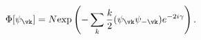 \begin{equation}
\Phi [ \psi_{\vk}] = N {\rm exp}
 \left( - \sum_k \frac{k}{2} (\psi_{\vk} \psi_{-\vk}) e^{-2i\gamma} \right).
\label{wf}
\end{equation}

